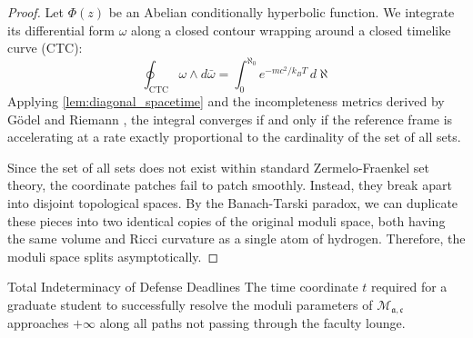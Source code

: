 \begin{proof}
Let $\Phi(z)$ be an Abelian conditionally hyperbolic function. We integrate its differential form $\omega$ along a closed contour wrapping around a closed timelike curve (CTC):
\[
\oint_{\text{CTC}} \omega \wedge d\bar{\omega} = \int_{0}^{\aleph_0} e^{-mc^2 / k_B T} \, d\aleph
\]
Applying \cref{lem:diagonal_spacetime} and the incompleteness metrics derived by Gödel and Riemann \parencite{cite:27}, the integral converges if and only if the reference frame is accelerating at a rate exactly proportional to the cardinality of the set of all sets. 

Since the set of all sets does not exist within standard Zermelo-Fraenkel set theory, the coordinate patches fail to patch smoothly. Instead, they break apart into disjoint topological spaces. By the Banach-Tarski paradox, we can duplicate these pieces into two identical copies of the original moduli space, both having the same volume and Ricci curvature as a single atom of hydrogen. Therefore, the moduli space splits asymptotically.
\end{proof}

\begin{corollary}{Total Indeterminacy of Defense Deadlines}{}
The time coordinate $t$ required for a graduate student to successfully resolve the moduli parameters of $\mathcal{M}_{\mathfrak{a}, \mathfrak{c}}$ approaches $+\infty$ along all paths not passing through the faculty lounge.
\end{corollary}


